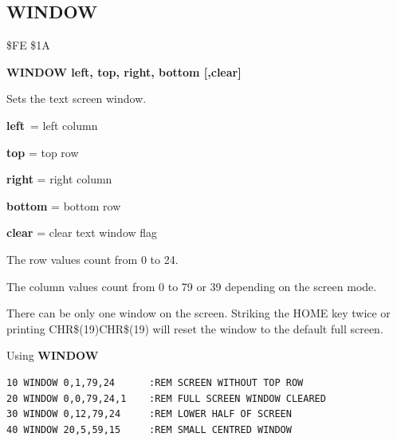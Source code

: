 \subsection{WINDOW}
\begin{description}[leftmargin=2cm,style=nextline]
\item [Token:] \$FE \$1A
\item [Format:] {\bf WINDOW left, top, right, bottom [,clear]}
\item [Usage:] Sets the text screen window.

                 {\bf left} = left column

                 {\bf top} = top row

                 {\bf right} = right column

                 {\bf bottom} = bottom row

                 {\bf clear} = clear text window flag

                 The row values count from 0 to 24.

                 The column values count from 0 to 79 or 39
                 depending on the screen mode.

\item [Remarks:] There can be only one window on the screen.
                 Striking the HOME key twice or printing
                 CHR\$(19)CHR\$(19) will reset the window
                 to the default full screen.

\item [Example:] Using {\bf WINDOW}
\begin{tcolorbox}[colback=black,coltext=white]
\verbatimfont{\codefont}
\begin{verbatim}
10 WINDOW 0,1,79,24      :REM SCREEN WITHOUT TOP ROW
20 WINDOW 0,0,79,24,1    :REM FULL SCREEN WINDOW CLEARED
30 WINDOW 0,12,79,24     :REM LOWER HALF OF SCREEN
40 WINDOW 20,5,59,15     :REM SMALL CENTRED WINDOW
\end{verbatim}
\end{tcolorbox}
\end{description}


\newpage
